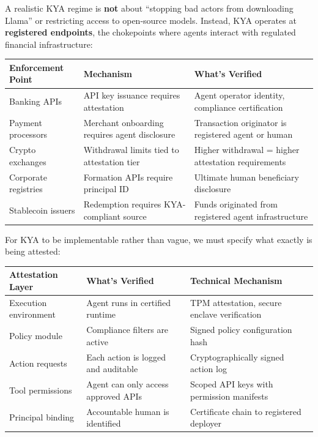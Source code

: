 \documentclass[11pt,letterpaper]{article}
\makeatletter
\newcommand{\etraneed}[1]{\par\if@nobreak\else\penalty\z@\ifdim\pagegoal<\maxdimen\ifdim\dimexpr\pagegoal-\pagetotal\relax<\dimexpr#1\relax\newpage\fi\fi\fi}
\makeatother
\begin{document}
\etraneed{16\baselineskip}
\begin{infobox}
A realistic KYA regime is \textbf{not} about ``stopping bad actors from downloading Llama'' or restricting access to open-source models. Instead, KYA operates at \textbf{registered endpoints}, the chokepoints where agents interact with regulated financial infrastructure:

\begin{center}
\small
\begin{tabular}{L{3cm}L{4cm}L{5cm}}
\toprule
\textbf{Enforcement Point} & \textbf{Mechanism} & \textbf{What's Verified} \\
\midrule
Banking APIs & API key issuance requires attestation & Agent operator identity, compliance certification \\
Payment processors & Merchant onboarding requires agent disclosure & Transaction originator is registered agent or human \\
Crypto exchanges & Withdrawal limits tied to attestation tier & Higher withdrawal = higher attestation requirements \\
Corporate registries & Formation APIs require principal ID & Ultimate human beneficiary disclosure \\
Stablecoin issuers & Redemption requires KYA-compliant source & Funds originated from registered agent infrastructure \\
\bottomrule
\end{tabular}
\end{center}
\end{infobox}

\begin{infobox}
For KYA to be implementable rather than vague, we must specify what exactly is being attested:

\begin{center}
\small
\begin{tabular}{L{3.5cm}L{4cm}L{5cm}}
\toprule
\textbf{Attestation Layer} & \textbf{What's Verified} & \textbf{Technical Mechanism} \\
\midrule
Execution environment & Agent runs in certified runtime & TPM attestation, secure enclave verification \\
Policy module & Compliance filters are active & Signed policy configuration hash \\
Action requests & Each action is logged and auditable & Cryptographically signed action log \\
Tool permissions & Agent can only access approved APIs & Scoped API keys with permission manifests \\
Principal binding & Accountable human is identified & Certificate chain to registered deployer \\
\bottomrule
\end{tabular}
\end{center}
\end{infobox}
\end{document}
